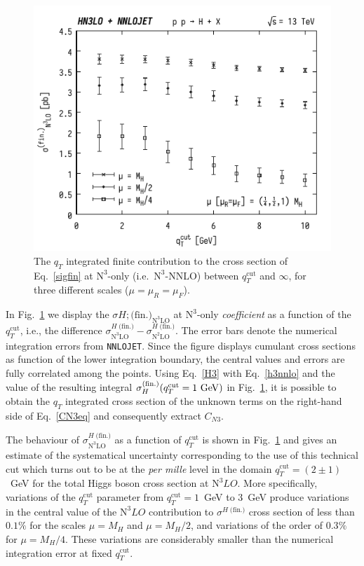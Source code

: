 \documentclass[12pt]{article}
\DeclareRobustCommand{\qt}{\ensuremath{q_T}\xspace}
\DeclareRobustCommand{\qtcut}{\ensuremath{q_T^\mathrm{cut}}\xspace}
\DeclareRobustCommand{\fin}{\text{(fin.)}\xspace}
\DeclareRobustCommand{\LO}{\text{LO}\xspace}
\DeclareRobustCommand{\N}[1]{\ensuremath{\text{N}^{#1}}} %
\begin{document}
\begin{figure}[tb]
\centering
\includegraphics[width=.6\linewidth]{./new_figures/finN3LO}
\caption{\label{fig:finiten3lo}{The $\qt$ integrated finite contribution to the cross section of Eq.~\eqref{sigfin} at \N3\LO-only (i.e.\ \N3\LO-NNLO) between $\qtcut$ and $\infty$, for three different scales ($\mu=\mu_{R}=\mu_{F}$).}}
\end{figure}

In Fig.~\ref{fig:finiten3lo} we display the $\sigma{H;\fin}_{\N3\LO}$ at \N3\LO-only \emph{coefficient} as a function of the $\qtcut$, i.e.,  the difference $\sigma^{H\; \fin}_{\N3\LO} - \sigma^{H\;\fin}_{\N2\LO}$. 
The error bars denote the numerical integration errors from  \texttt{NNLOJET}. Since the figure displays cumulant cross sections as function of the lower integration boundary, the central values and errors are fully correlated among the points.
Using Eq.~\eqref{H3} with Eq.~\eqref{h3nnlo} and the value of the resulting integral $ \sigma_{H}^{\fin}(\qtcut=1~{\rm GeV})$ in Fig.~\ref{fig:finiten3lo}, it is possible to obtain the $\qt$ integrated cross section of the unknown terms on the right-hand side of Eq.~\eqref{CN3eq} and consequently extract $C_{N3}$. 

The behaviour of $\sigma^{H\;\fin}_{\N3\LO}$ as a function of $\qtcut$ is shown in Fig.~\ref{fig:finiten3lo} and gives an estimate of the systematical uncertainty corresponding to the use of this technical cut which turns out to be at the \textit{per mille} level in the domain $\qtcut=(2\pm 1)$~GeV for the total Higgs boson cross section at $\N3LO$. More specifically, variations of the $\qtcut$ parameter from $\qtcut=1$~GeV to 3~GeV produce variations in the central value of the 
$\N3LO$ contribution to $\sigma^{H\;\fin}$ cross section of less than $0.1\%$ for the scales $\mu=M_{H}$ and $\mu=M_{H}/2$, and variations of the order of $0.3\%$ for $\mu=M_{H}/4$. These variations are considerably smaller than the numerical integration error at fixed $\qtcut$. 
\end{document}
